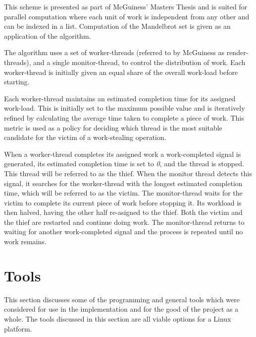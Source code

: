 This scheme is presented as part of McGuiness' Masters Thesis \cite{jmcguin} and is suited for parallel computation where each unit of work is independent 
from any other and can be indexed in a list. Computation of the Mandelbrot set is given as an application of the algorithm. 

The algorithm uses a set of \glspl{worker-thread} (referred to by McGuiness as render-threads), 
and a single \gls{monitor-thread}, to control the distribution of work. Each \gls{worker-thread} is
initially given an equal share of the overall work-load before starting.

Each \gls{worker-thread} maintains an estimated completion time for its assigned work-load. This is initially set to the maximum possible value and
is iteratively refined by calculating the average time taken to complete a piece of work. This metric is used as a policy for deciding which
thread is the most suitable candidate for the victim of a work-stealing operation.

When a worker-thread completes its assigned work a work-completed signal is generated, its estimated
completion time is set to \textit{0}, and the thread is stopped. This thread will be referred to as the \gls{thief}.
When the monitor thread detects this signal, it searches for the worker-thread with the longest estimated completion time, 
which will be referred to as the \gls{victim}. The \gls{monitor-thread} waits for the victim to complete its current piece of work before stopping it.
Its workload is then halved, having the other half re-asigned to the thief. Both the victim and the thief are restarted and continue doing work.
The monitor-thread returns to waiting for another work-completed signal and the process is repeated until no work remains.

\section{Tools}

This section discusses some of the programming and general tools which were considered
for use in the implementation and for the good of the project as a whole.
The tools discussed in this section are all viable options for a Linux platform.

